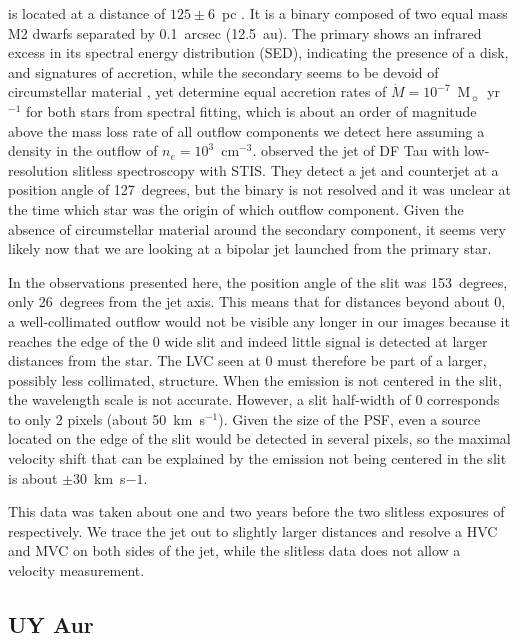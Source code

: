 \documentclass[twocolumn,trackchanges]{aastex63}
\begin{document}
 is located at a distance of $125\pm6$~pc
\citep{2016A&A...595A...1G,2018A&A...616A...1G}. It is a binary composed of two
equal mass M2 dwarfs separated by 0.1~arcsec (12.5~au). The primary shows an
infrared excess in its spectral energy distribution (SED), indicating the
presence of a disk, and signatures of accretion, while the secondary seems to
be devoid of circumstellar material \citep{2017ApJ...845..161A}, yet
\citet{2003ApJ...583..334H} determine equal accretion rates of $\dot
M=10^{-7}$~M$_{\sun}$~yr$^{-1}$ for both stars from spectral fitting, which is
about an order of magnitude above the mass loss rate of all outflow components
we detect here assuming a density in the outflow of $n_e=10^3$~cm$^{-3}$.
\citet{2004ApJ...609..261H} observed the jet of DF Tau with low-resolution slitless spectroscopy with STIS. They detect a jet and counterjet at a
position angle of 127~degrees, but the binary is not resolved and it was unclear at the time which star was the origin of which outflow component. Given the absence of circumstellar material around the secondary component, it seems very likely now that we are looking at a bipolar jet launched from the primary star. 

In the observations presented here, the position angle of the slit was 153~degrees, only 26~degrees from the jet axis. This means that for distances beyond about 0, a well-collimated outflow would not be visible any longer in our images because it reaches the edge of the 0 wide slit and indeed little signal is detected at larger distances from the star. The LVC seen at 0 must therefore be part of a larger, possibly less collimated, structure. When the emission is not centered in the slit, the wavelength scale is not accurate. However, a slit half-width of 0 corresponds to only 2 pixels (about 50~km~s$^{-1}$). Given the size of the PSF, even a source located on the edge of the slit would be detected in several pixels, so the maximal velocity shift that can be explained by the emission not being centered in the slit is about $\pm30$~km~s${-1}$.

This data was taken about one and two years before the two slitless exposures of \citet{2004ApJ...609..261H} respectively. We trace the jet out to slightly larger distances and resolve a HVC and MVC on both sides of the jet, while the slitless data does not allow a velocity measurement.


\subsection{UY Aur}
\end{document}
